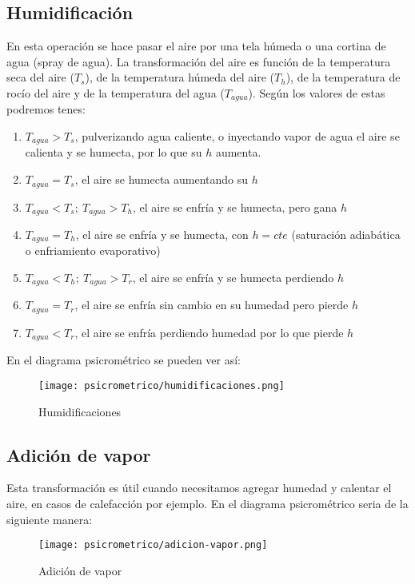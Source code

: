         \subsection{Humidificaci\'on}

        En esta operaci\'on se hace pasar el aire por una tela h\'umeda o una cortina de agua (spray de agua). La transformaci\'on del aire es funci\'on de la temperatura seca del aire ($T_s$), de la temperatura h\'umeda del aire ($T_h$), de la temperatura de roc\'io del aire y de la temperatura del agua ($T_{agua}$). Seg\'un los valores de estas podremos tenes:
        \begin{enumerate}
            \item $T_{agua} > T_s$, pulverizando agua caliente, o inyectando vapor de agua el aire se calienta y se humecta, por lo que su $h$ aumenta.
            \item $T_{agua} = T_s$, el aire se humecta aumentando su $h$
            \item $T_{agua} < T_s;\ T_{agua}>T_h$, el aire se enfr\'ia y se humecta, pero gana $h$
            \item $T_{agua}=T_h$, el aire se enfr\'ia y se humecta, con $h = cte$ (saturaci\'on adiab\'atica o enfriamiento evaporativo)
            \item $T_{agua}<T_h;\ T_{agua}>T_r$, el aire se enfr\'ia y se humecta perdiendo $h$
            \item $T_{agua}=T_r$, el aire se enfr\'ia sin cambio en su humedad pero pierde $h$
            \item $T_{agua}<T_r$, el aire se enfr\'ia perdiendo humedad por lo que pierde $h$
        \end{enumerate}
        En el diagrama psicrom\'etrico se pueden ver as\'i:
         \begin{figure}[H]
             \centering
             \texttt{[image: psicrometrico/humidificaciones.png]}
             \caption{Humidificaciones}
             \label{fig:humidificaciones}
         \end{figure}

        \subsection{Adici\'on de vapor}
        Esta transformaci\'on es \'util cuando necesitamos agregar humedad y calentar el aire, en casos de calefacci\'on por ejemplo. En el diagrama psicrom\'etrico seria de la siguiente manera:
         \begin{figure}[H]
             \centering
             \texttt{[image: psicrometrico/adicion-vapor.png]}
             \caption{Adici\'on de vapor}
             \label{fig:adicion-vapor}
         \end{figure}
        
